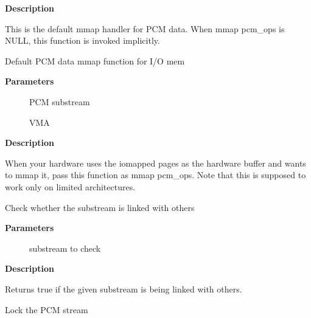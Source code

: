 \documentclass[a4paper,8pt,english]{sphinxmanual}
\begin{document}
\textbf{Description}

This is the default mmap handler for PCM data.  When mmap pcm\_ops is NULL,
this function is invoked implicitly.

\begin{fulllineitems}
\label{sound/kernel-api/alsa-driver-api:c.snd_pcm_lib_mmap_iomem}
Default PCM data mmap function for I/O mem

\end{fulllineitems}


\textbf{Parameters}
\begin{description}
\item[{}] \leavevmode
PCM substream

\item[{}] \leavevmode
VMA

\end{description}

\textbf{Description}

When your hardware uses the iomapped pages as the hardware buffer and
wants to mmap it, pass this function as mmap pcm\_ops.  Note that this
is supposed to work only on limited architectures.

\begin{fulllineitems}
\label{sound/kernel-api/alsa-driver-api:c.snd_pcm_stream_linked}
Check whether the substream is linked with others

\end{fulllineitems}


\textbf{Parameters}
\begin{description}
\item[{}] \leavevmode
substream to check

\end{description}

\textbf{Description}

Returns true if the given substream is being linked with others.

\begin{fulllineitems}
\label{sound/kernel-api/alsa-driver-api:c.snd_pcm_stream_lock_irqsave}
Lock the PCM stream

\end{fulllineitems}
\end{document}
